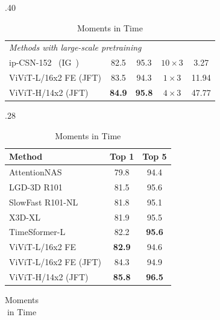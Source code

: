 \begin{table}[tb]
\begin{subtable}[t]{.40\linewidth}
{\begin{tabular}{lcccc}
				\midrule
				\multicolumn{4}{l}{\textit{Methods with large-scale pretraining}}                                \\ 
				ip-CSN-152~\cite{tran_iccv_2019} (IG~\cite{mahajan_eccv_2018}) 			  &  82.5					& 95.3			&  $10 \times 3$ & 3.27	  \\
				ViViT-L/16x2 FE (JFT) 														& 83.5 	&  94.3   & $1 \times 3$ &  11.94 \\  %
				ViViT-H/14x2 (JFT) 														&  \textbf{84.9} &  \textbf{95.8} 	& $4 \times 3$ & 47.77 \\  %
				\bottomrule
			\end{tabular}
		}
		\label{tab:sota_kinetics400}
	\end{subtable}
  	\hfill
  	\begin{subtable}[t]{.28\linewidth}
		\centering
  		\caption{Kinetics 600}
  		\setlength{\tabcolsep}{4pt} %
		\vspace{-0.3\baselineskip}
  		\scriptsize{
	  		\begin{tabular}{lcc}
	  			\toprule
	  			Method 																			 & Top 1                & Top 5      \\ %
	  			\midrule
	  			AttentionNAS~\cite{wang_nas_eccv_2020}						  &  79.8				   & 94.4  \\ %
	  			LGD-3D R101~\cite{qiu_lgd_cvpr_2019}							&  81.5				    & 95.6	\\ %
	  			SlowFast R101-NL~\cite{feichtenhofer_iccv_2019}       		&  81.8                     &  95.1   \\ %
	  			X3D-XL~\cite{feichtenhofer_cvpr_2020}      						 &  81.9					&  95.5		\\ %
	  			TimeSformer-L~\cite{bertasius_arxiv_2021}					  & 82.2				& \textbf{95.6}		\\ %
	  			ViViT-L/16x2 FE 														  	 &  \textbf{82.9} 	& 94.6  \\  %
	  			\midrule
	  			ViViT-L/16x2 FE (JFT) 													 & 84.3 & 94.9 \\ %
	  			ViViT-H/14x2 (JFT) 													& \textbf{85.8} & \textbf{96.5} \\ %
	  			\bottomrule
	  		\end{tabular}
	  		\label{tab:sota_kinetics600}
  		}
  		\vspace{0.35\baselineskip} %
  		\centering
  		\caption{Moments in Time}
  		\vspace{-0.3\baselineskip}
  		\setlength{\tabcolsep}{6pt} %
  		\scriptsize{
  			\begin{tabular}{lcc}

\end{tabular}}
\end{subtable}
\end{table}
